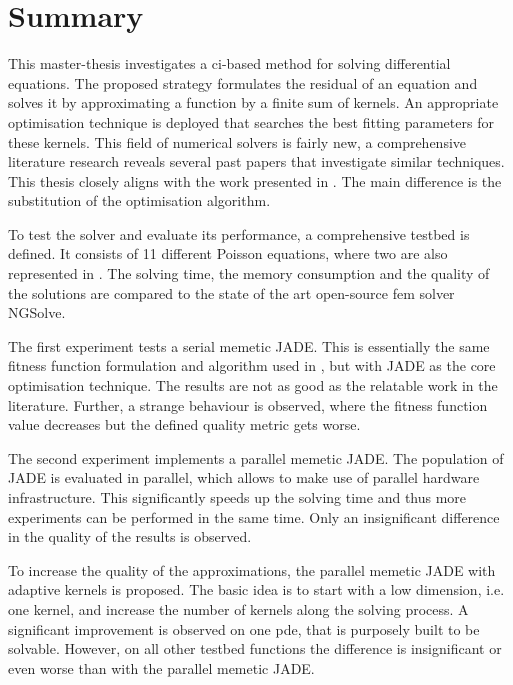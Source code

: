 \documentclass[./\jobname.tex]{subfiles}
\begin{document}
\chapter{Summary}

This master-thesis investigates a \gls{ci}-based method for solving differential equations. The proposed strategy formulates the residual of an equation and solves it by approximating a function by a finite sum of kernels. An appropriate optimisation technique is deployed that searches the best fitting parameters for these kernels. This field of numerical solvers is fairly new, a comprehensive literature research reveals several past papers that investigate similar techniques. This thesis closely aligns with the work presented in \cite{chaquet_using_2019}. The main difference is the substitution of the optimisation algorithm. 

To test the solver and evaluate its performance, a comprehensive testbed is defined. It consists of 11 different Poisson equations, where two are also represented in \cite{chaquet_using_2019}. The solving time, the memory consumption and the quality of the solutions are compared to the state of the art open-source \gls{fem} solver NGSolve. 

The first experiment tests a serial memetic JADE. This is essentially the same fitness function formulation and algorithm used in \cite{chaquet_using_2019}, but with JADE as the core optimisation technique. The results are not as good as the relatable work in the literature. Further, a strange behaviour is observed, where the fitness function value decreases but the defined quality metric gets worse. 

The second experiment implements a parallel memetic JADE. The population of JADE is evaluated in parallel, which allows to make use of parallel hardware infrastructure. This significantly speeds up the solving time and thus more experiments can be performed in the same time. Only an insignificant difference in the quality of the results is observed. 

To increase the quality of the approximations, the parallel memetic JADE with adaptive kernels is proposed. The basic idea is to start with a low dimension, i.e. one kernel, and increase the number of kernels along the solving process. A significant improvement is observed on one \gls{pde}, that is purposely built to be solvable. However, on all other testbed functions the difference is insignificant or even worse than with the parallel memetic JADE. 
\end{document}
